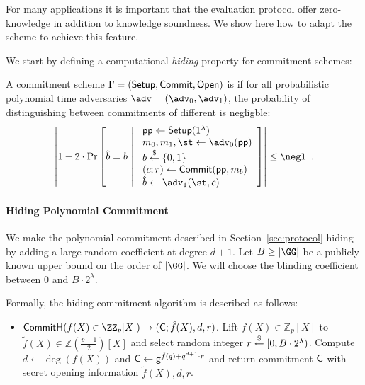 For many applications it is important that the evaluation protocol offer zero-knowledge in addition to knowledge soundness. We show here how to adapt the scheme to achieve this feature.

We start by defining a computational \emph{hiding} property for commitment schemes:

\begin{definition}
A commitment scheme $\Gamma = (\textsf{{Setup}}, \textsf{{Commit}}, \textsf{{Open}})$ is  if for all probabilistic polynomial time adversaries $\adv = (\adv_0, \adv_1)$, the probability of distinguishing between commitments of different is negligble:
\[
	\left| 1 - 2 \cdot \mathrm{Pr}\left[
		\hat{b} = b \ \middle| \ 
		\begin{array}{l}
			\params \gets \pro{Setup}(1^\lambda) \\
			m_0, m_1, \st \gets \adv_0(\params) \\
			b \sample \{0,1\} \\
			(c; r) \gets \pro{Commit}(\params, m_b) \\
			\hat{b} \gets \adv_1(\st, c)
		\end{array}
	\right] \right| \leq \negl \enspace .
\]
\end{definition}

\paragraph{Hiding Polynomial Commitment}
We make the polynomial commitment described in Section~\ref{sec:protocol} hiding by adding a large random coefficient at degree $d+1$. Let $B\geq |\GG|$ be a publicly known upper bound on the order of $|\GG|$. We will choose the blinding coefficient between $0$ and $B\cdot 2^\lambda$. 

Formally, the hiding commitment algorithm is described as follows:
\begin{itemize}
	\item $\pro{CommitH}(f(X) \in \ZZ_p[X]) \rightarrow (\gr{C}; \hat{f}(X), d, r)$. Lift $f(X) \in \mathbb{Z}_p[X]$ to $\tilde{f}(X) \in \mathbb{Z}(\frac{p-1}{2})[X]$ and select random integer $r \overset{\$}{\gets} [0,B\cdot 2^\lambda)$. Compute $d \gets \deg(f(X))$ and $\mathsf{C} \gets \mathsf{g}^{\tilde{f}(q)+q^{d+1} \cdot r}$ and return commitment $\mathsf{C}$ with secret opening information $\tilde{f}(X), d, r$.
\end{itemize}

